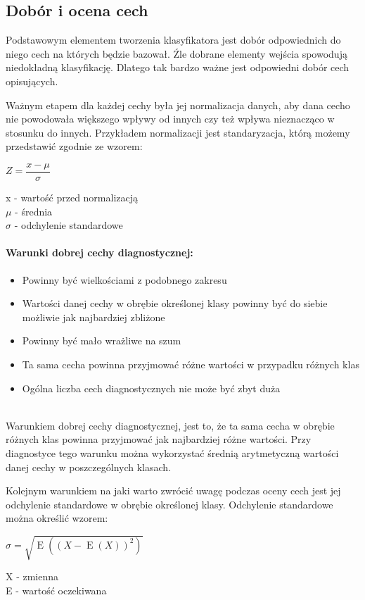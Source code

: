 \documentclass[a4paper,12pt,twoside,openany]{report}
\begin{document}
\subsection{Dobór i ocena cech}
	Podstawowym elementem tworzenia klasyfikatora jest dobór odpowiednich do niego cech na których będzie bazował. Źle dobrane elementy wejścia spowodują niedokładną klasyfikację. Dlatego tak bardzo ważne jest odpowiedni dobór cech opisujących.
	
	Ważnym etapem dla każdej cechy była jej normalizacja danych, aby dana cecho nie powodowała większego wpływy od innych czy też wpływa nieznacząco w stosunku do innych. Przykładem normalizacji jest standaryzacja, którą możemy przedstawić zgodnie ze wzorem: 
	\begin{center}
		{\large $ Z = \dfrac{x - \mu}{\sigma} $ \par}
	\end{center}
    x - wartość przed normalizacją \\ $\mu$ - średnia \\ $\sigma$ - odchylenie standardowe

	\paragraph{Warunki dobrej cechy diagnostycznej: }
	\begin{itemize}
		\item Powinny być wielkościami z podobnego zakresu
		\item Wartości danej cechy w obrębie określonej klasy powinny być do siebie możliwie jak najbardziej zbliżone
		\item Powinny być mało wrażliwe na szum
		\item Ta sama cecha powinna przyjmować różne wartości w przypadku różnych klas
		\item Ogólna liczba cech diagnostycznych nie może być zbyt duża
	\end{itemize}
	\mbox{} \\
	Warunkiem dobrej cechy diagnostycznej, jest to, że ta sama cecha w obrębie różnych klas powinna przyjmować jak najbardziej różne wartości. Przy diagnostyce tego warunku można wykorzystać średnią arytmetyczną wartości danej cechy w poszczególnych klasach.
	
	Kolejnym warunkiem na jaki warto zwrócić uwagę podczas oceny cech jest jej odchylenie standardowe w obrębie określonej klasy. Odchylenie standardowe można określić wzorem: 
	\begin{center}
		{\large $ \sigma = {\sqrt {\operatorname {E} ((X-\operatorname {E} (X))^{2})}} $ \par}
	\end{center}
	X - zmienna \\
	E - wartość oczekiwana 
	
\end{document}
